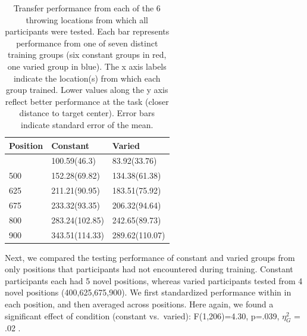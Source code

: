 \documentclass[
  11pt,
  letterpaper,
]{article}
\begin{document}
\hfill\break
\hfill\break
\hfill\break

\begin{longtable}[]{@{}lll@{}}

\caption{\label{tbl-e2table1}Transfer performance from each of the 6
throwing locations from which all participants were tested. Each bar
represents performance from one of seven distinct training groups (six
constant groups in red, one varied group in blue). The x axis labels
indicate the location(s) from which each group trained. Lower values
along the y axis reflect better performance at the task (closer distance
to target center). Error bars indicate standard error of the mean.}

\tabularnewline

\toprule\noalign{}
Position & Constant & Varied \\
\midrule\noalign{}
\endhead
\bottomrule\noalign{}
\endlastfoot
400 & 100.59(46.3) & 83.92(33.76) \\
500 & 152.28(69.82) & 134.38(61.38) \\
625 & 211.21(90.95) & 183.51(75.92) \\
675 & 233.32(93.35) & 206.32(94.64) \\
800 & 283.24(102.85) & 242.65(89.73) \\
900 & 343.51(114.33) & 289.62(110.07) \\

\end{longtable}

Next, we compared the testing performance of constant and varied groups
from only positions that participants had not encountered during
training. Constant participants each had 5 novel positions, whereas
varied participants tested from 4 novel positions (400,625,675,900). We
first standardized performance within in each position, and then
averaged across positions. Here again, we found a significant effect of
condition (constant vs.~varied): F(1,206)=4.30, p=.039, \(\eta^{2}_G\) =
.02 .
\end{document}
